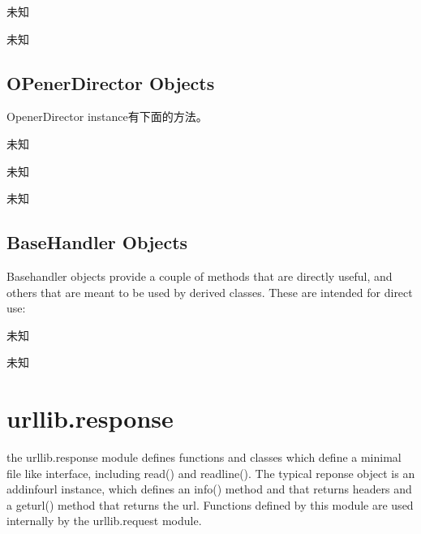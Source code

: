 \noindent{\color{red}{Request.get\_header(header\_name, default=None):}}
\par{未知}\\

\noindent{\color{red}{Request.header\_items():}}
\par{未知}\\

\subsection{OPenerDirector Objects}
OpenerDirector instance有下面的方法。

\noindent{\color{red}{OpenerDirector.add\_Handler(Handler):}}
\par{未知}\\

\noindent{\color{red}{OpenerDirector.open(url, data=None[, timeout]):}}
\par{未知}\\

\noindent{\color{red}{OpenerDirector.error(proto, *args):}}
\par{未知}\\

\subsection{BaseHandler Objects}
Basehandler objects provide a couple of methods that are directly useful, and others that are
meant to be used by derived classes. These are intended for direct use:

\noindent{\color{red}{BaseHandler.add\_parent(director):}}
\par{未知}\\

\noindent{\color{red}{BaseHandler.close():}}
\par{未知}\\





\section{urllib.response}
the urllib.response module defines functions and classes which define a minimal file like
interface, including read() and readline(). The typical reponse object is an addinfourl instance,
 which defines an info() method and that returns headers and a geturl() method that returns the
url. Functions defined by this module are used internally by the urllib.request module.




